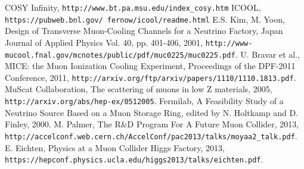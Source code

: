\documentclass{jacow}
\begin{document}
\begin{thebibliography}{9}   %




COSY Infinity, \texttt{http://www.bt.pa.msu.edu/index\_cosy.htm}
ICOOL, \texttt{ https://pubweb.bnl.gov/~fernow/icool/readme.html}
E.S. Kim, M. Yoon, Design of Transverse Muon-Cooling Channels for a Neutrino Factory, Japan Journal of Applied Physics Vol. 40, pp. 401-406, 2001, \texttt{http://www-mucool.fnal.gov/mcnotes/public/pdf/muc0225/muc0225.pdf}.
U. Bravar et al., MICE: the Muon Ionization Cooling Experiment, Proceedings of the DPF-2011 Conference, 2011, \texttt{http://arxiv.org/ftp/arxiv/papers/1110/1110.1813.pdf}.
MuScat Collaboration, The scattering of muons in  low Z materials, 2005, \texttt{http://arxiv.org/abs/hep-ex/0512005}.
Fermilab, A Feasibility Study of a Neutrino Source Based on a Muon Storage Ring, edited by N. Holtkamp and D. Finley, 2000.
M. Palmer, The R\&D Program For A Future Muon Collider, 2013, \texttt{http://accelconf.web.cern.ch/AccelConf/pac2013/talks/moyaa2\_talk.pdf}.
E. Eichten, Physics at a Muon Collider Higgs Factory, 2013, \texttt{https://hepconf.physics.ucla.edu/higgs2013/talks/eichten.pdf}.



\end{thebibliography}
\end{document}
